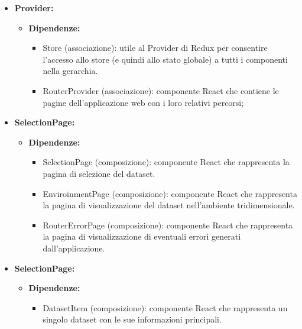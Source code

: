 \begin{itemize}
    \item \textbf{Provider:}
    \begin{itemize}
        \item \textbf{Dipendenze:}
        \begin{itemize}
            \item Store (associazione): utile al Provider di Redux per consentire l'accesso allo store (e quindi allo stato globale) a tutti i componenti nella gerarchia.
            \item RouterProvider (associazione): componente React che contiene le pagine dell'applicazione web con i loro relativi percorsi;
        \end{itemize} 
    \end{itemize}

    \item \textbf{SelectionPage:}
    \begin{itemize}
        \item \textbf{Dipendenze:}
        \begin{itemize}
            \item SelectionPage (composizione): componente React che rappresenta la pagina di selezione del dataset.
            \item EnviroinmentPage (composizione): componente React che rappresenta la pagina di visualizzazione del dataset nell'ambiente tridimensionale.
            \item RouterErrorPage (composizione): componente React che rappresenta la pagina di visualizzazione di eventuali errori generati dall'applicazione.
        \end{itemize} 
    \end{itemize}

    \item \textbf{SelectionPage:}
    \begin{itemize}
        \item \textbf{Dipendenze:}
        \begin{itemize}
            \item DatasetItem (composizione): componente React che rappresenta un singolo dataset con le sue informazioni principali.
        \end{itemize} 
    \end{itemize}
\end{itemize}

